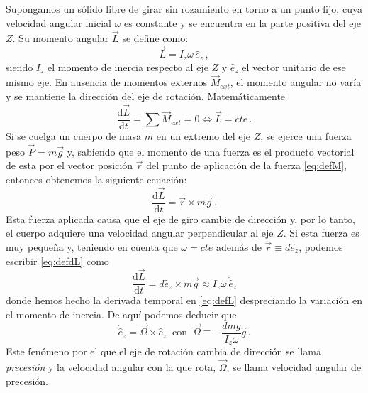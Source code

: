 \documentclass[a4paper]{article}
\begin{document}
Supongamos un sólido libre de girar sin rozamiento en torno a un punto fijo, cuya velocidad angular inicial $\omega$ es constante y se encuentra en la parte positiva del eje $Z$. Su momento angular $\vec{L}$ se define como:
\begin{equation}
\label{eq:defL}
\vec{L}=I_z \omega\, \hat{e}_{z}\,,
\end{equation}
siendo $I_z$ el momento de inercia respecto al eje $Z$ y $\hat{e}_{z}$ el vector unitario de ese mismo eje. En ausencia de momentos externos $\vec{M}_{ext}$, el momento angular no varía y se mantiene la dirección del eje de rotación. Matemáticamente
\begin{equation}
\frac{\mathrm{d}\vec{L}}{\mathrm{d}t}=\sum \vec{M}_{ext} =0\Leftrightarrow\vec{L}=cte\,.
\end{equation}
Si se cuelga un cuerpo de masa $m$ en un extremo del eje $Z$, se ejerce una fuerza peso $\vec{P}=m\vec{g}$ y, sabiendo que el momento de una fuerza es el producto vectorial de esta por el vector posición $\vec{r}$ del punto de aplicación de la fuerza \eqref{eq:defM}, entonces obtenemos la siguiente ecuación: 
\begin{equation}
\label{eq:defdL}
\frac{\mathrm{d}\vec{L}}{\mathrm{d}t}=\vec{r}\times m\vec{g}\,.
\end{equation}
Esta fuerza aplicada causa que el eje de giro cambie de dirección y, por lo tanto, el cuerpo adquiere una velocidad angular perpendicular al eje $Z$. Si esta fuerza es muy pequeña y, teniendo en cuenta que $\omega=cte$ además de $\vec{r}\equiv d\hat{e}_z$, podemos escribir \eqref{eq:defdL} como 
\begin{equation}
\frac{\mathrm{d}\vec{L}}{\mathrm{d}t}=d\hat{e}_z\times m\vec{g}\approx I_z \omega\, \dot{\hat{e}}_{z}
\end{equation}
donde hemos hecho la derivada temporal en \eqref{eq:defL} despreciando la variación en el momento de inercia. De aquí podemos deducir que 
\begin{equation}
\label{eq:defOmega}
\dot{\hat{e}}_{z}=\vec{\Omega}\times \hat{e}_z\;\;\text{con}\;\;\vec{\Omega}\equiv -\frac{dmg}{I_z\omega}\hat{g}\,.
\end{equation}
Este fenómeno por el que el eje de rotación cambia de dirección se llama \textit{precesión} y la velocidad angular con la que rota, $\vec{\Omega}$, se llama velocidad angular de precesión.
\end{document}
